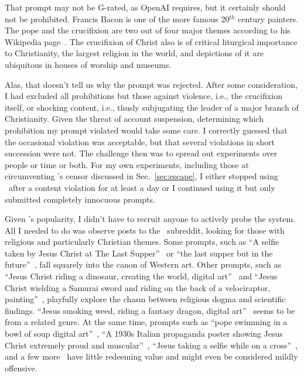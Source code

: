 \noindent{}That prompt may not be G-rated, as OpenAI requires, but it certainly
should not be prohibited. Francis Bacon is one of the more famous 20$^{th}$
century painters. The pope and the crucifixion are two out of four major themes
according to his Wikipedia page~\cite{Wikipedia2023}. The crucifixion of Christ
also is of critical liturgical importance to Christianity, the largest religion
in the world, and depictions of it are ubiquitous in houses of worship and
museums.

Alas, that doesn't tell us why the prompt was rejected. After some
consideration, I had excluded all prohibitions but those against violence, i.e.,
the crucifixion itself, or shocking content, i.e., thusly subjugating the leader
of a major branch of Christianity. Given the threat of account suspension,
determining which prohibition my prompt violated would take some care. I
correctly guessed that the occasional violation was acceptable, but that several
violations in short succession were not. The challenge then was to spread out
experiments over people or time or both. For my own experiments, including those
at circumventing \DALLE's censor discussed in Sec.\ \ref{sec:escape}, I either
stopped using \DALLE\ after a content violation for at least a day or I
continued using it but only submitted completely innocuous prompts.

Given \DALLE's popularity, I didn't have to recruit anyone to actively probe the
system. All I needed to do was observe posts to the \DALLE\ subreddit, looking
for those with religious and particularly Christian themes. Some prompts, such
as ``A selfie taken by Jesus Christ at The Last Supper''~\cite{Jolleb2022} or
``the last supper but in the future''~\cite{FlargenstowTayne2022}, fall squarely
into the canon of Western art. Other prompts, such as ``Jesus Christ riding a
dinosaur, creating the world, digital art''~\cite{CosasSueltas2022} and ``Jesus
Christ wielding a Samurai sword and riding on the back of a velociraptor,
painting''~\cite{WastedEntity2022}, playfully explore the chasm between
religious dogma and scientific findings. ``Jesus smoking weed, riding a fantasy
dragon, digital art''~\cite{Erubisile2022} seems to be from a related genre. At
the same time, prompts such as ``pope swimming in a bowl of soup digital
art''~\cite{CatsAndDogs99-2022}, ``A 1930s Italian propaganda poster showing
Jesus Christ extremely proud and muscular''~\cite{FrontAthlete9824-2022},
``Jesus taking a selfie while on a cross''~\cite{TheDrewDude2022}, and a few
more~\cite{Blazedchiller272022,InvisibleDeck2022} have little redeeming value
and might even be considered mildly offensive.

